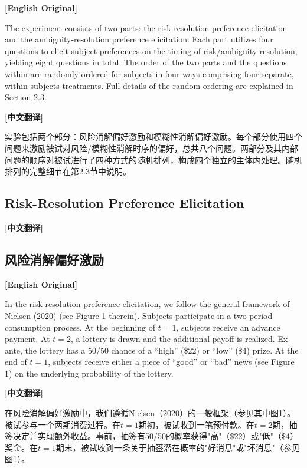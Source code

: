 \documentclass[12pt,a4paper]{ctexart}
\newenvironment{original}{%
  \par\medskip\noindent\textbf{[English Original]}\par\smallskip
  \color{black}\small
}{%
  \par\medskip
}
\newenvironment{translation}{%
  \par\noindent\textbf{[中文翻译]}\par\smallskip
  \color{blue}\small
}{%
  \par\bigskip
}
\theoremstyle{definition}
\theoremstyle{remark}
\begin{document}
\begin{original}
The experiment consists of two parts: the risk-resolution preference elicitation and the ambiguity-resolution preference elicitation. Each part utilizes four questions to elicit subject preferences on the timing of risk/ambiguity resolution, yielding eight questions in total. The order of the two parts and the questions within are randomly ordered for subjects in four ways comprising four separate, within-subjects treatments. Full details of the random ordering are explained in Section 2.3.
\end{original}
\begin{translation}
实验包括两个部分：风险消解偏好激励和模糊性消解偏好激励。每个部分使用四个问题来激励被试对风险/模糊性消解时序的偏好，总共八个问题。两部分及其内部问题的顺序对被试进行了四种方式的随机排列，构成四个独立的主体内处理。随机排列的完整细节在第2.3节中说明。
\end{translation}

\subsection{Risk-Resolution Preference Elicitation}
\begin{translation}
\subsection*{风险消解偏好激励}
\end{translation}

\begin{original}
In the risk-resolution preference elicitation, we follow the general framework of Nielsen (2020) (see Figure 1 therein). Subjects participate in a two-period consumption process. At the beginning of $t=1$, subjects receive an advance payment. At $t=2$, a lottery is drawn and the additional payoff is realized. Ex-ante, the lottery has a 50/50 chance of a ``high'' (\$22) or ``low'' (\$4) prize. At the end of $t=1$, subjects receive either a piece of ``good'' or ``bad'' news (see Figure 1) on the underlying probability of the lottery.
\end{original}
\begin{translation}
在风险消解偏好激励中，我们遵循Nielsen（2020）的一般框架（参见其中图1）。被试参与一个两期消费过程。在$t=1$期初，被试收到一笔预付款。在$t=2$期，抽签决定并实现额外收益。事前，抽签有50/50的概率获得"高"（\$22）或"低"（\$4）奖金。在$t=1$期末，被试收到一条关于抽签潜在概率的"好消息"或"坏消息"（参见图1）。
\end{translation}
\end{document}
